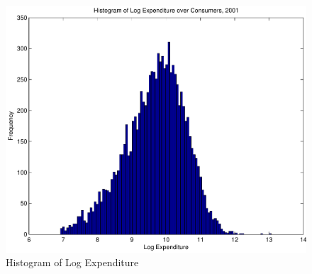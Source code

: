 \documentclass[12pt]{article}
\begin{document}
\begin{figure}
	\begin{center}
		\includegraphics[scale=.8]{pics/exphist_cropped.pdf}
	\end{center}
	\label{fig:exphist}
	\caption{Histogram of  Log Expenditure}
\end{figure}
\end{document}
